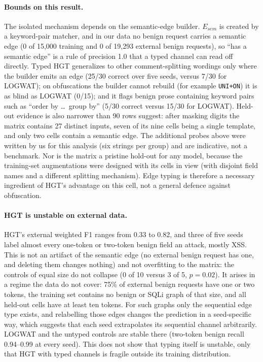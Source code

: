 \paragraph{Bounds on this result.}
The isolated mechanism depends on the semantic-edge builder. $E_{sem}$ is created by a keyword-pair matcher, and in our data no benign request carries a semantic edge (0 of 15{,}000 training and 0 of 19{,}293 external benign requests), so ``has a semantic edge'' is a rule of precision 1.0 that a typed channel can read off directly. Typed HGT generalizes to other comment-splitting wordings only where the builder emits an edge (25/30 correct over five seeds, versus 7/30 for LOGWAT); on obfuscations the builder cannot rebuild (for example \texttt{UNI+ON}) it is as blind as LOGWAT (0/15); and it flags benign prose containing keyword pairs such as ``order by \dots\ group by'' (5/30 correct versus 15/30 for LOGWAT). Held-out evidence is also narrower than 90 rows suggest: after masking digits the matrix contains 27 distinct inputs, seven of its nine cells being a single template, and only two cells contain a semantic edge. The additional probes above were written by us for this analysis (six strings per group) and are indicative, not a benchmark. Nor is the matrix a pristine hold-out for any model, because the training-set augmentations were designed with its cells in view (with disjoint field names and a different splitting mechanism). Edge typing is therefore a necessary ingredient of HGT's advantage on this cell, not a general defence against obfuscation.

\paragraph{HGT is unstable on external data.}
HGT's external weighted F1 ranges from 0.33 to 0.82, and three of five seeds label almost every one-token or two-token benign field an attack, mostly XSS. This is not an artifact of the semantic edge (no external benign request has one, and deleting them changes nothing) and not overfitting to the matrix: the controls of equal size do not collapse (0 of 10 versus 3 of 5, $p=0.02$). It arises in a regime the data do not cover: 75\% of external benign requests have one or two tokens, the training set contains no benign or SQLi graph of that size, and all held-out cells have at least ten tokens. For such graphs only the sequential edge type exists, and relabelling those edges changes the prediction in a seed-specific way, which suggests that each seed extrapolates its sequential channel arbitrarily. LOGWAT and the untyped controls are stable there (two-token benign recall 0.94--0.99 at every seed). This does not show that typing itself is unstable, only that HGT with typed channels is fragile outside its training distribution.

